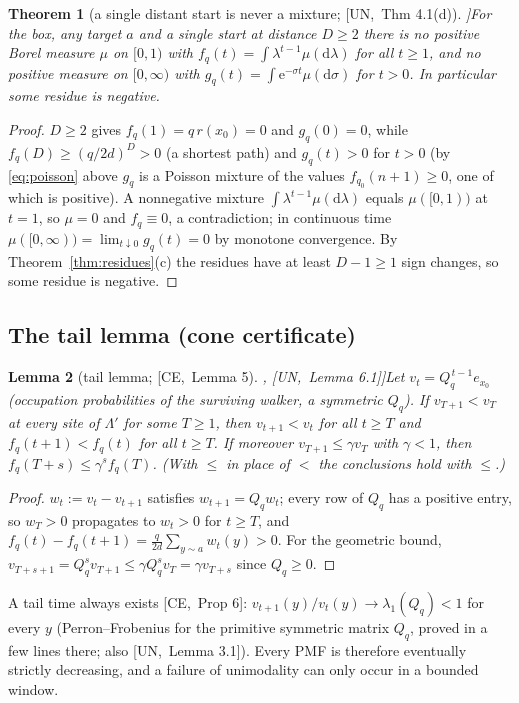 \documentclass[10pt,a4paper]{article}
\theoremstyle{plain}
\newtheorem{theorem}{Theorem}[section]
\newtheorem{lemma}[theorem]{Lemma}
\theoremstyle{definition}
\newcommand{\src}[2]{[\textsf{#1},~#2]}           %
\newcommand{\UNI}{\textsf{UN}}
\newcommand{\CER}{\textsf{CE}}
\newcommand{\ee}{\mathrm{e}}
\newcommand{\dd}{\mathrm{d}}
\begin{document}
\begin{theorem}[a single distant start is never a mixture; \src{\UNI}{Thm 4.1(d)}]\label{thm:notmixture}
For the box, any target $a$ and a single start at distance $D\ge2$ there is no positive Borel measure $\mu$ on $[0,1)$ with $f_q(t)=\int\lambda^{t-1}\mu(\dd\lambda)$ for all $t\ge1$, and no positive measure on $[0,\infty)$ with $g_q(t)=\int\ee^{-\sigma t}\mu(\dd\sigma)$ for $t>0$. In particular some residue is negative.
\end{theorem}
\begin{proof}
$D\ge2$ gives $f_q(1)=q\,r(x_0)=0$ and $g_q(0)=0$, while $f_q(D)\ge(q/2d)^D>0$ (a shortest path) and $g_q(t)>0$ for $t>0$ (by \eqref{eq:poisson} above $g_q$ is a Poisson mixture of the values $f_{q_0}(n+1)\ge0$, one of which is positive). A nonnegative mixture $\int\lambda^{t-1}\mu(\dd\lambda)$ equals $\mu([0,1))$ at $t=1$, so $\mu=0$ and $f_q\equiv0$, a contradiction; in continuous time $\mu([0,\infty))=\lim_{t\downarrow0}g_q(t)=0$ by monotone convergence. By Theorem~\ref{thm:residues}(c) the residues have at least $D-1\ge1$ sign changes, so some residue is negative.
\end{proof}

\subsection{The tail lemma (cone certificate)}

\begin{lemma}[tail lemma; \src{\CER}{Lemma 5}, \src{\UNI}{Lemma 6.1}]\label{lem:tail}
Let $v_t=Q_q^{\,t-1}e_{x_0}$ (occupation probabilities of the surviving walker, a symmetric $Q_q$). If $v_{T+1}<v_T$ at every site of $\Lambda'$ for some $T\ge1$, then $v_{t+1}<v_t$ for all $t\ge T$ and $f_q(t+1)<f_q(t)$ for all $t\ge T$. If moreover $v_{T+1}\le\gamma v_T$ with $\gamma<1$, then $f_q(T+s)\le\gamma^sf_q(T)$. (With $\le$ in place of $<$ the conclusions hold with $\le$.)
\end{lemma}
\begin{proof}
$w_t:=v_t-v_{t+1}$ satisfies $w_{t+1}=Q_qw_t$; every row of $Q_q$ has a positive entry, so $w_T>0$ propagates to $w_t>0$ for $t\ge T$, and $f_q(t)-f_q(t+1)=\frac q{2d}\sum_{y\sim a}w_t(y)>0$. For the geometric bound, $v_{T+s+1}=Q_q^sv_{T+1}\le\gamma Q_q^sv_T=\gamma v_{T+s}$ since $Q_q\ge0$.
\end{proof}

A tail time always exists \src{\CER}{Prop 6}: $v_{t+1}(y)/v_t(y)\to\lambda_1(Q_q)<1$ for every $y$ (Perron--Frobenius for the primitive symmetric matrix $Q_q$, proved in a few lines there; also \src{\UNI}{Lemma 3.1}). Every PMF is therefore eventually strictly decreasing, and a failure of unimodality can only occur in a bounded window.
\end{document}
